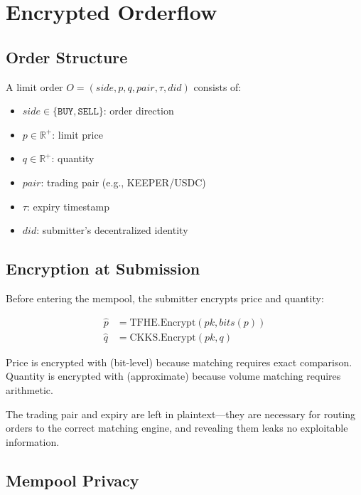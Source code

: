 \section{Encrypted Orderflow}

\label{sec:encrypted_orderflow}

\subsection{Order Structure}

A limit order $O = (\textit{side}, p, q, \textit{pair}, \tau, \textit{did})$ consists of:

\begin{itemize}
    \item $\textit{side} \in \{\texttt{BUY}, \texttt{SELL}\}$: order direction
    \item $p \in \mathbb{R}^+$: limit price
    \item $q \in \mathbb{R}^+$: quantity
    \item $\textit{pair}$: trading pair (e.g., KEEPER/USDC)
    \item $\tau$: expiry timestamp
    \item $\textit{did}$: submitter's decentralized identity
\end{itemize}

\subsection{Encryption at Submission}

Before entering the mempool, the submitter encrypts price and quantity:

\begin{align}
\hat{p} &= \text{TFHE.Encrypt}(pk, \textit{bits}(p)) \label{eq:enc_price} \\
\hat{q} &= \text{CKKS.Encrypt}(pk, q) \label{eq:enc_qty}
\end{align}

Price is encrypted with \TFHE{} (bit-level) because matching requires exact comparison. Quantity is encrypted with \CKKS{} (approximate) because volume matching requires arithmetic.

The trading pair and expiry are left in plaintext---they are necessary for routing orders to the correct matching engine, and revealing them leaks no exploitable information.

\subsection{Mempool Privacy}

